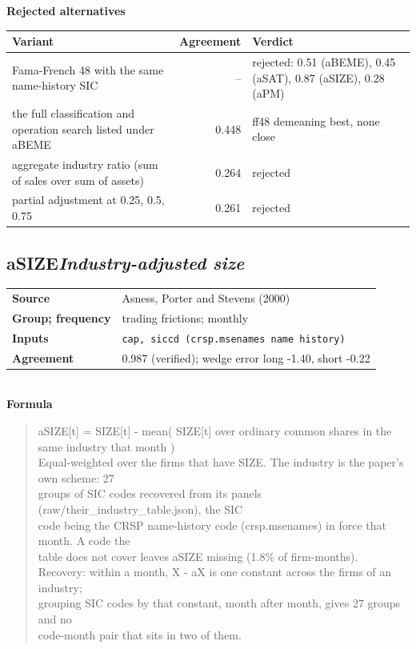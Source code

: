 \documentclass[11pt]{article}
\begin{document}
\textbf{Rejected alternatives}\\[2pt]
{\small\begin{longtable}{@{}p{9.6cm}rp{4.3cm}@{}}
\toprule Variant & Agreement & Verdict\\\midrule\endhead
Fama-French 48 with the same name-history SIC & -- & rejected: 0.51 (aBEME), 0.45 (aSAT), 0.87 (aSIZE), 0.28 (aPM)\\
the full classification and operation search listed under aBEME & 0.448 & ff48 demeaning best, none close\\
aggregate industry ratio (sum of sales over sum of assets) & 0.264 & rejected\\
partial adjustment at 0.25, 0.5, 0.75 & 0.261 & rejected\\
\bottomrule\end{longtable}}
\subsection*{aSIZE\quad\normalfont\itshape Industry-adjusted size}
\begin{tabular}{@{}p{3.3cm}p{12.3cm}@{}}
\textbf{Source} & Asness, Porter and Stevens (2000)\\
\textbf{Group; frequency} & trading frictions; monthly\\
\textbf{Inputs} & \texttt{cap, siccd (crsp.msenames name history)}\\
\textbf{Agreement} & 0.987 (verified); wedge error long -1.40, short -0.22\\
\end{tabular}\\[4pt]
\textbf{Formula}
\begin{quote}\small
aSIZE[t] = SIZE[t] - mean( SIZE[t] over ordinary common shares in the same industry that month )\\
Equal-weighted over the firms that have SIZE. The industry is the paper's own scheme: 27\\
groups of SIC codes recovered from its panels (raw/their\_industry\_table.json), the SIC\\
code being the CRSP name-history code (crsp.msenames) in force that month. A code the\\
table does not cover leaves aSIZE missing (1.8\% of firm-months).\\
Recovery: within a month, X - aX is one constant across the firms of an industry;\\
grouping SIC codes by that constant, month after month, gives 27 groups and no\\
code-month pair that sits in two of them.\\

\end{quote}
\end{document}
